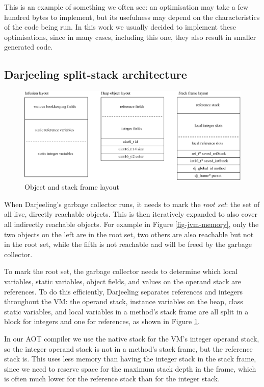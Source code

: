 This is an example of something we often see: an optimisation may take a few hundred bytes to implement, but its usefulness may depend on the characteristics of the code being run. In this work we usually decided to implement these optimisations, since in many cases, including this one, they also result in smaller generated code.

\subsection{Darjeeling split-stack architecture}
\label{sec-darjeeling-split-architecure}

\begin{figure}
\centering
\includegraphics[width=0.8\linewidth]{object-and-stack-frame-layout.eps}
\caption{Object and stack frame layout}
\label{fig-object-and-stack-frame-layout}
\end{figure}

When Darjeeling's garbage collector runs, it needs to mark the \emph{root set}: the set of all live, directly reachable objects. This is then iteratively expanded to also cover all indirectly reachable objects. For example in Figure \ref{fig-jvm-memory}, only the two objects on the left are in the root set, two others are also reachable but not in the root set, while the fifth is not reachable and will be freed by the garbage collector.

To mark the root set, the garbage collector needs to determine which local variables, static variables, object fields, and values on the operand stack are references. To do this efficiently, Darjeeling separates references and integers throughout the VM: the operand stack, instance variables on the heap, class static variables, and local variables in a method's stack frame are all split in a block for integers and one for references, as shown in Figure \ref{fig-object-and-stack-frame-layout}.

In our AOT compiler we use the native stack for the VM's integer operand stack, so the integer operand stack is not in a method's stack frame, but the reference stack is. This uses less memory than having the integer stack in the stack frame, since we need to reserve space for the maximum stack depth in the frame, which is often much lower for the reference stack than for the integer stack.

